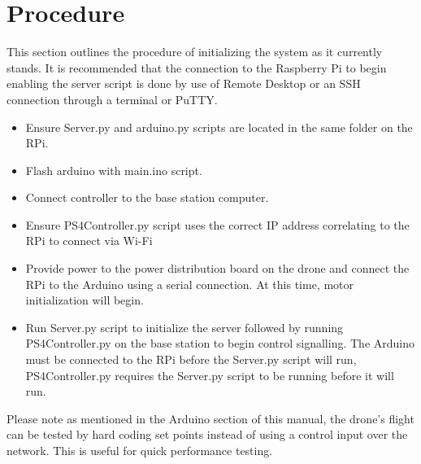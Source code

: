\section{Procedure}
This section outlines the procedure of initializing the system as it currently stands. It is recommended that the connection to the Raspberry Pi to begin enabling the server script is done by use of Remote Desktop or an SSH connection through a terminal or PuTTY.
\begin{itemize}


\item Ensure Server.py and arduino.py scripts are located in the same folder on the RPi.
\item Flash arduino with main.ino script.
\item Connect controller to the base station computer.
\item Ensure PS4Controller.py script uses the correct IP address correlating to the RPi to connect via Wi-Fi
\item Provide power to the power distribution board on the drone and connect the RPi to the Arduino using a serial connection. At this time, motor initialization will begin.
\item Run Server.py script to initialize the server followed by running PS4Controller.py on the base station to begin control signalling. The Arduino must be connected to the RPi before the Server.py script will run, PS4Controller.py requires the Server.py script to be running before it will run.


\end{itemize}

Please note as mentioned in the Arduino section of this manual, the drone's flight can be tested by hard coding set points instead of using a control input over the network. This is useful for quick performance testing.